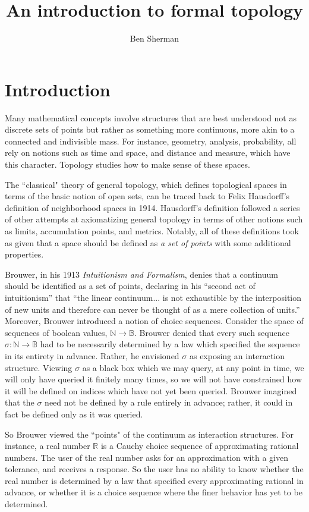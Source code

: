 \documentclass{article}           %
\title{An introduction to formal topology}
\author{Ben Sherman}
\newcommand{\nat}{\mathbb{N}}
\newcommand{\bool}{\mathbb{B}}
\begin{document}
\maketitle

\section{Introduction}

Many mathematical concepts involve structures that are best understood not as discrete sets of points but rather as something more continuous, more akin to a connected and indivisible mass. For instance, geometry, analysis, probability, all rely on notions such as time and space, and distance and measure, which have this character. Topology studies how to make sense of these spaces.

The ``classical" theory of general topology, which defines topological spaces in terms of the basic notion of open sets, can be traced back to Felix Hausdorff's definition of neighborhood spaces in 1914. Hausdorff's definition followed a series of other attempts at axiomatizing general topology in terms of other notions such as limits, accumulation points, and metrics. Notably, all of these definitions took as given that a space should be defined as \emph{a set of points} with some additional properties.

Brouwer, in his 1913 \emph{Intuitionism and Formalism}, denies that a continuum should be identified as a set of points, declaring in his ``second act of intuitionism'' that ``the linear continuum... is not exhaustible by the interposition of new units and therefore can never be thought of as a mere collection of units.'' Moreover, Brouwer introduced a notion of choice sequences. Consider the space of sequences of boolean values, $\nat \to \bool$. Brouwer denied that every such sequence $\sigma : \nat \to \bool$ had to be necessarily determined by a law which specified the sequence in its entirety in advance. Rather, he envisioned $\sigma$ as exposing an interaction structure. Viewing $\sigma$ as a black box which we may query, at any point in time, we will only have queried it finitely many times, so we will not have constrained how it will be defined on indices which have not yet been queried. Brouwer imagined that the $\sigma$ need not be defined by a rule entirely in advance; rather, it could in fact be defined only as it was queried.

So Brouwer viewed the ``points" of the continuum as interaction structures. For instance, a real number $\mathbb{R}$ is a Cauchy choice sequence of approximating rational numbers. The user of the real number asks for an approximation with a given tolerance, and receives a response. So the user has no ability to know whether the real number is determined by a law that specified every approximating rational in advance, or whether it is a choice sequence where the finer behavior has yet to be determined.
\end{document}
